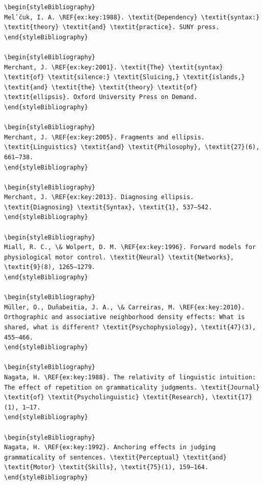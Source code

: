 \begin{verbatim}
\begin{styleBibliography}
Melʹčuk, I. A. \REF{ex:key:1988}. \textit{Dependency} \textit{syntax:} \textit{theory} \textit{and} \textit{practice}. SUNY press.
\end{styleBibliography}

\begin{styleBibliography}
Merchant, J. \REF{ex:key:2001}. \textit{The} \textit{syntax} \textit{of} \textit{silence:} \textit{Sluicing,} \textit{islands,} \textit{and} \textit{the} \textit{theory} \textit{of} \textit{ellipsis}. Oxford University Press on Demand.
\end{styleBibliography}

\begin{styleBibliography}
Merchant, J. \REF{ex:key:2005}. Fragments and ellipsis. \textit{Linguistics} \textit{and} \textit{Philosophy}, \textit{27}(6), 661–738.
\end{styleBibliography}

\begin{styleBibliography}
Merchant, J. \REF{ex:key:2013}. Diagnosing ellipsis. \textit{Diagnosing} \textit{Syntax}, \textit{1}, 537–542.
\end{styleBibliography}

\begin{styleBibliography}
Miall, R. C., \& Wolpert, D. M. \REF{ex:key:1996}. Forward models for physiological motor control. \textit{Neural} \textit{Networks}, \textit{9}(8), 1265–1279.
\end{styleBibliography}

\begin{styleBibliography}
Müller, O., Duñabeitia, J. A., \& Carreiras, M. \REF{ex:key:2010}. Orthographic and associative neighborhood density effects: What is shared, what is different? \textit{Psychophysiology}, \textit{47}(3), 455–466.
\end{styleBibliography}

\begin{styleBibliography}
Nagata, H. \REF{ex:key:1988}. The relativity of linguistic intuition: The effect of repetition on grammaticality judgments. \textit{Journal} \textit{of} \textit{Psycholinguistic} \textit{Research}, \textit{17}(1), 1–17.
\end{styleBibliography}

\begin{styleBibliography}
Nagata, H. \REF{ex:key:1992}. Anchoring effects in judging grammaticality of sentences. \textit{Perceptual} \textit{and} \textit{Motor} \textit{Skills}, \textit{75}(1), 159–164.
\end{styleBibliography}


\end{verbatim}
